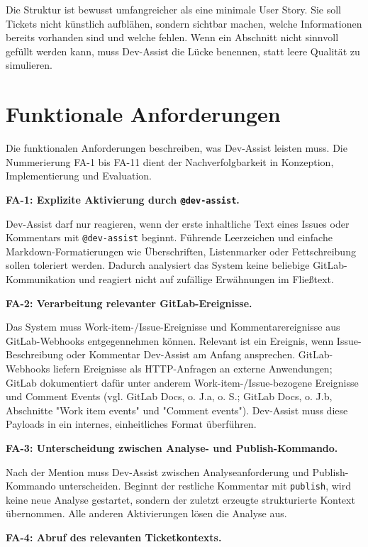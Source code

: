 \documentclass[12pt,a4paper,oneside]{scrreprt}
\begin{document}
Die Struktur ist bewusst umfangreicher als eine minimale User Story. Sie soll Tickets nicht künstlich aufblähen, sondern sichtbar machen, welche Informationen bereits vorhanden sind und welche fehlen. Wenn ein Abschnitt nicht sinnvoll gefüllt werden kann, muss Dev-Assist die Lücke benennen, statt leere Qualität zu simulieren.

\section{Funktionale Anforderungen}

Die funktionalen Anforderungen beschreiben, was Dev-Assist leisten muss. Die Nummerierung FA-1 bis FA-11 dient der Nachverfolgbarkeit in Konzeption, Implementierung und Evaluation.

\textbf{FA-1: Explizite Aktivierung durch \texttt{@dev-assist}.}

Dev-Assist darf nur reagieren, wenn der erste inhaltliche Text eines Issues oder Kommentars mit \texttt{@dev-assist} beginnt. Führende Leerzeichen und einfache Markdown-Formatierungen wie Überschriften, Listenmarker oder Fettschreibung sollen toleriert werden. Dadurch analysiert das System keine beliebige GitLab-Kommunikation und reagiert nicht auf zufällige Erwähnungen im Fließtext.

\textbf{FA-2: Verarbeitung relevanter GitLab-Ereignisse.}

Das System muss Work-item-/Issue-Ereignisse und Kommentarereignisse aus GitLab-Webhooks entgegennehmen können. Relevant ist ein Ereignis, wenn Issue-Beschreibung oder Kommentar Dev-Assist am Anfang ansprechen. GitLab-Webhooks liefern Ereignisse als HTTP-Anfragen an externe Anwendungen; GitLab dokumentiert dafür unter anderem Work-item-/Issue-bezogene Ereignisse und Comment Events (vgl. GitLab Docs, o. J.a, o. S.; GitLab Docs, o. J.b, Abschnitte "Work item events" und "Comment events"). Dev-Assist muss diese Payloads in ein internes, einheitliches Format überführen.

\textbf{FA-3: Unterscheidung zwischen Analyse- und Publish-Kommando.}

Nach der Mention muss Dev-Assist zwischen Analyseanforderung und Publish-Kommando unterscheiden. Beginnt der restliche Kommentar mit \texttt{publish}, wird keine neue Analyse gestartet, sondern der zuletzt erzeugte strukturierte Kontext übernommen. Alle anderen Aktivierungen lösen die Analyse aus.

\textbf{FA-4: Abruf des relevanten Ticketkontexts.}
\end{document}
